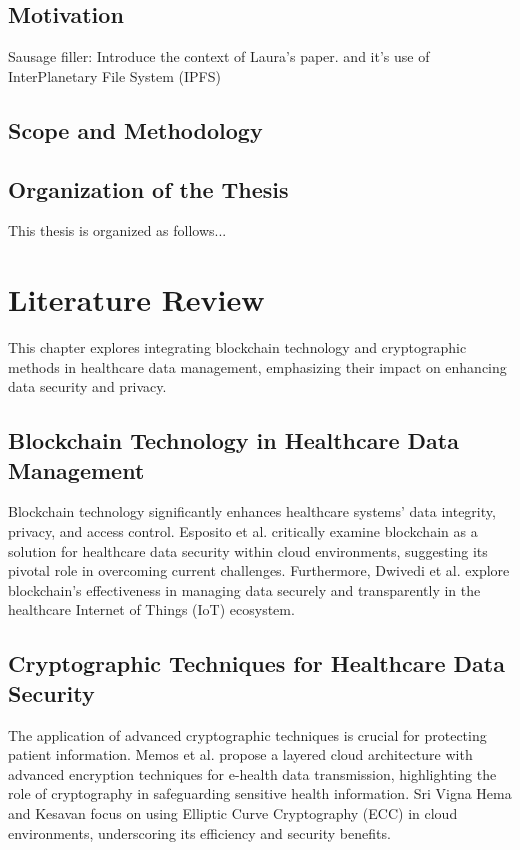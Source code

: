 \documentclass[cic,tc,english]{iiufrgs}
\begin{document}
\section{Motivation}
Sausage filler: Introduce the context of Laura's paper. \cite{laura2023} and it's use of InterPlanetary File System (IPFS) \cite{benet2013ipfs}

\section{Scope and Methodology}


\section{Organization of the Thesis}
This thesis is organized as follows...


\chapter{Literature Review}

This chapter explores integrating blockchain technology and cryptographic methods in healthcare data management, emphasizing their impact on enhancing data security and privacy.

\section{Blockchain Technology in Healthcare Data Management}
Blockchain technology significantly enhances healthcare systems' data integrity, privacy, and access control. Esposito et al. \cite{Esposito2018} critically examine blockchain as a solution for healthcare data security within cloud environments, suggesting its pivotal role in overcoming current challenges. Furthermore, Dwivedi et al. \cite{Dwivedi2019} explore blockchain's effectiveness in managing data securely and transparently in the healthcare Internet of Things (IoT) ecosystem.

\section{Cryptographic Techniques for Healthcare Data Security}
The application of advanced cryptographic techniques is crucial for protecting patient information. Memos et al. \cite{Memos2021} propose a layered cloud architecture with advanced encryption techniques for e-health data transmission, highlighting the role of cryptography in safeguarding sensitive health information. Sri Vigna Hema and Kesavan \cite{sri2019} focus on using Elliptic Curve Cryptography (ECC) in cloud environments, underscoring its efficiency and security benefits.
\end{document}
